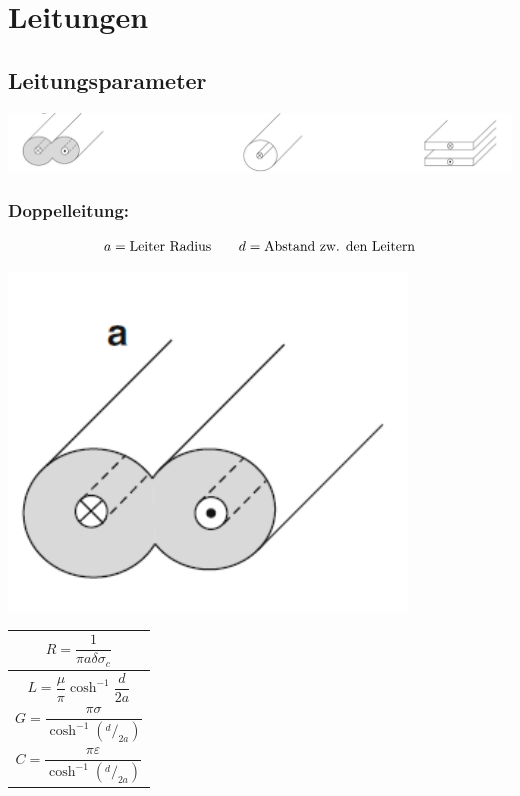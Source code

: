 \section{Leitungen}

\subsection{Leitungsparameter}


\includegraphics[width=\columnwidth]{Figures/Leitungsparameter.png}


\subsubsection{Doppelleitung:}
\[
    a = \text{Leiter Radius} \qquad d = \text{Abstand zw. den Leitern} \\
\]

\includegraphics[width=0.4\columnwidth]{Figures/Doppelleitung.png}
{\renewcommand*{\arraystretch}{0.2}
\begin{tabularx}{0.5\columnwidth}{|X|}
    \hline
    \[R  = \frac{1}{\pi a\delta\sigma_c}\]              \\
    \hline
    \[L = \frac{\mu}{\pi} \cosh^{-1}\frac{d}{2a}\]      \\
    \hline
    \[G = \frac{\pi\sigma}{\cosh^{-1}(^d/_{2a})}\]      \\
    \hline
    \[C = \frac{\pi\varepsilon}{\cosh^{-1}(^d/_{2a})}\] \\
    \hline
\end{tabularx}}

